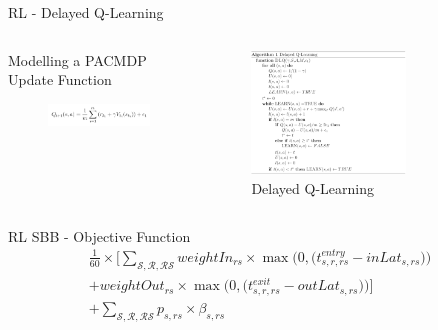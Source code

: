 \documentclass[aspectratio=169]{beamer}
\begin{document}
\begin{frame}{RL - Delayed Q-Learning}
    \begin{columns}[T, onlytextwidth]
        \begin{column}{0.5\textwidth}
            Modelling a PACMDP \\
            Update Function\:
            \begin{figure}
                \centering
                \includegraphics[width=\textwidth]{assets/RL/EQ1.PNG}
            \end{figure}
        \end{column}
        
        \begin{column}{0.5\textwidth}
            \begin{figure}
                \centering
                \includegraphics[width=0.7\textwidth]{assets/RL/ALG1.PNG}
                \caption{Delayed Q-Learning}
                \label{fig:dlq}
            \end{figure}
        \end{column}
    \end{columns}
\end{frame}



\begin{frame}{RL SBB - Objective Function}
    \begin{multline*}\label{eq:rl-obj}
        \frac{1}{60}\times\Bigg[\sum_{\mathcal{S},\mathcal{R},\mathcal{RS}}{weightIn_{rs}\times \max{\bigg(0,\big(t_{s,r,rs}^{entry} - inLat_{s,rs} \big)\bigg)}}\\+weightOut_{rs} \times \max{\bigg(0,\big(t_{s,r,rs}^{exit} - outLat_{s,rs}\big)\bigg)}\Bigg] \\ + \sum_{\mathcal{S},\mathcal{R},\mathcal{RS}}{p_{s,rs}\times\beta_{s,rs}}
    \end{multline*}
\end{frame}
\end{document}
